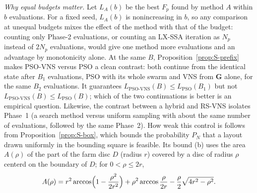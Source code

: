 \emph{Why equal budgets matter.} Let $L_A(b)$ be the best $F_p$ found by method $A$ within $b$ evaluations. For a fixed seed, $L_A(b)$ is nonincreasing in $b$, so any comparison at unequal budgets mixes the effect of the method with that of the budget: counting only Phase-2 evaluations, or counting an LX-SSA iteration as $N_p$ instead of $2N_p$ evaluations, would give one method more evaluations and an advantage by monotonicity alone. At the same $B$, Proposition~\ref{prop:S-prefix} makes PSO-VNS versus PSO a clean contrast: both continue from the identical state after $B_1$ evaluations, PSO with its whole swarm and VNS from $\mathbf G$ alone, for the same $B_2$ evaluations. It guarantees $L_{\text{PSO-VNS}}(B)\le L_{\text{PSO}}(B_1)$ but not $L_{\text{PSO-VNS}}(B)\le L_{\text{PSO}}(B)$; which of the two continuations is better is an empirical question. Likewise, the contrast between a hybrid and RS-VNS isolates Phase~1 (a search method versus uniform sampling with about the same number of evaluations, followed by the same Phase~2). How weak this control is follows from Proposition~\ref{prop:S-box}, which bounds the probability $P_N$ that a layout drawn uniformly in the bounding square is feasible. Its bound (b) uses the area $A(\rho)$ of the part of the farm disc $D$ (radius $r$) covered by a disc of radius $\rho$ centerd on the boundary of $D$; for $0<\rho\le2r$,
\begin{equation}
A(\rho)=r^2\arccos\Bigl(1-\frac{\rho^2}{2r^2}\Bigr)+\rho^2\arccos\frac{\rho}{2r}-\frac{\rho}{2}\sqrt{4r^2-\rho^2} .
\label{eq:S-th-lens}
\end{equation}

